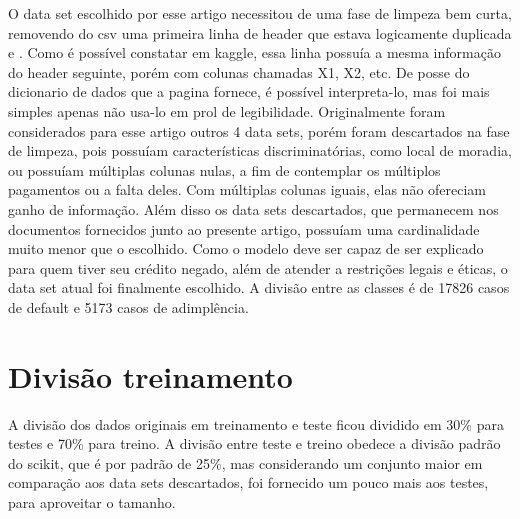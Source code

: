 \documentclass[12pt]{article}
\begin{document}
O data set escolhido por esse artigo\cite{dataset} necessitou de uma fase de limpeza bem curta, removendo do csv uma primeira linha de header que estava logicamente duplicada e . Como é possível constatar em kaggle\cite{kaggle}, essa linha possuía a mesma informação do header seguinte, porém com colunas chamadas X1, X2, etc. De posse do dicionario de dados que a pagina fornece, é possível interpreta-lo, mas foi mais simples apenas não usa-lo em prol de legibilidade. Originalmente foram considerados para esse artigo outros 4 data sets, porém foram descartados na fase de limpeza, pois possuíam características discriminatórias, como local de moradia, ou possuíam múltiplas colunas nulas, a fim de contemplar os múltiplos pagamentos ou a falta deles. Com múltiplas colunas iguais, elas não ofereciam ganho de informação. Além disso os data sets descartados, que permanecem nos documentos fornecidos junto ao presente artigo, possuíam uma cardinalidade muito menor que o escolhido. Como o modelo deve ser capaz de ser explicado para quem tiver seu crédito negado, além de atender a restrições legais e éticas, o data set atual foi finalmente escolhido. A divisão entre as classes é de 17826 casos de default e 5173 casos de adimplência.

\section{Divisão treinamento}

A divisão dos dados originais em treinamento e teste ficou dividido em 30\% para testes e 70\% para treino. A divisão entre teste e treino obedece a divisão padrão do scikit, que é por padrão de 25\%, mas considerando um conjunto maior em comparação aos data sets descartados, foi fornecido um pouco mais aos testes, para aproveitar o tamanho.
\end{document}
